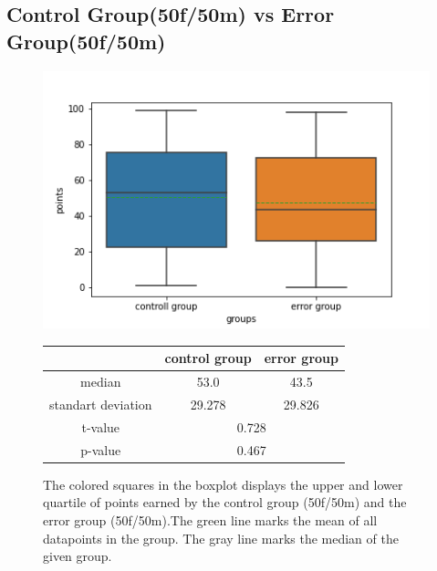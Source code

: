 \documentclass[runningheads]{llncs}
\begin{document}
\subsection{Control Group(50f/50m) vs Error Group(50f/50m)}
\begin{figure}[!h]
    \begin{minipage}{0.4\textwidth}        
        \includegraphics[width=\textwidth]{code/generate/all.png}
        \caption{The colored squares in the boxplot displays
        the upper and lower quartile of points earned by the control group (50f/50m) and
        the error group (50f/50m).The green line marks the mean of all datapoints in the group.
        The gray line marks the median  of the given group.} \label{fig2}
    \end{minipage}
\hfill
\begin{minipage}{0.4\textwidth}
\begin{tabular}[]{| c | c | c |}
        \hline
        & control group & error group \\
        \hline
        median & 53.0&43.5 \\
        \hline
        standart deviation & 29.278&29.826 \\
        \hline
        t-value & \multicolumn{2}{c|}{0.728} \\
        \hline
        p-value & \multicolumn{2}{c|}{0.467} \\
        \hline            
\end{tabular}
\end{minipage}
\end{figure}
\end{document}
